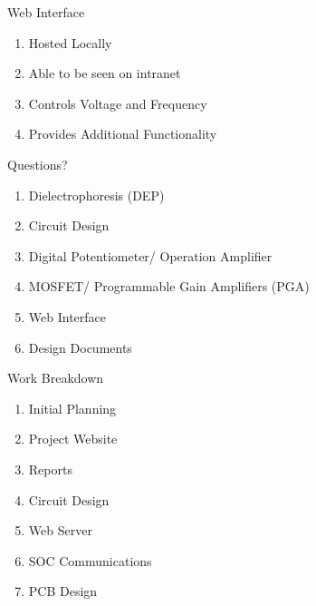 \begin{frame}{Web Interface}
  \begin{enumerate}
    \item Hosted Locally
    \item Able to be seen on intranet
    \item Controls Voltage and Frequency
    \item Provides Additional Functionality
  \end{enumerate}
\end{frame}

\begin{frame}{Questions?}
  \begin{enumerate}
    \item Dielectrophoresis (DEP)
    \item Circuit Design
    \item Digital Potentiometer/ Operation Amplifier
    \item MOSFET/ Programmable Gain Amplifiers (PGA)
    \item Web Interface
    \item Design Documents
  \end{enumerate}
\end{frame}

\begin{frame}{Work Breakdown}
  \begin{enumerate}
    \item Initial Planning
    \item Project Website
    \item Reports
    \item Circuit Design
    \item Web Server
    \item SOC Communications
    \item PCB Design
  \end{enumerate}
\end{frame}

